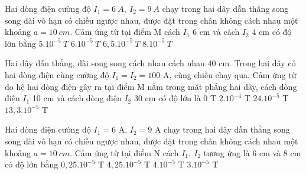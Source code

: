 \begin{vidu} %
Hai dòng điện cường độ $I_1=6\ A,\ I_2=9\ A$ chạy trong hai dây dẫn thẳng song song dài vô hạn có chiều ngược nhau, được đặt trong chân không cách nhau một khoảng $a=10\ cm$. Cảm ứng từ tại điểm M cách $I_1$ 6 cm và cách $I_2$ 4 cm có độ lớn bằng
\choice
{$5.10^{-5}\ T$}
{$6.10^{-5}\ T$}
{\True $6,5.10^{-5}\ T$}
{$8.10^{-5}\ T$}
\end{vidu}
\begin{vidu} %
Hai dây dẫn thẳng, dài song song cách nhau cách nhau 40 cm. Trong hai dây có hai dòng điện cùng cường độ $I_1 = I_2 = 100$ A, cùng chiều chạy qua. Cảm ứng từ do hệ hai dòng điện gây ra tại điểm M nằm trong mặt phẳng hai dây, cách dòng điện ${I_1}$ 10 cm và cách dòng điện ${I_2}$ 30 cm có độ lớn là
\choice
{0 T}
{$2.10^{-4}$ T}
{$24.10^{-5}$ T}
{\True $13,3.10^{-5}$ T}
\end{vidu}
\begin{vidu} %
Hai dòng điện cường độ $I_1 =6$ A, $I_2 = 9$ A chạy trong hai dây dẫn thẳng song song dài vô hạn có chiều ngược nhau, được đặt trong chân không cách nhau một khoảng $a = 10\ cm$. Cảm ứng từ tại điểm N cách ${I_1},\ {I_2}$ tương ứng là 6 cm và 8 cm có độ lớn bằng
\choice
{$0,25.10^{-5}$ T}
{$4,25.10^{-5}$ T}
{$4.10^{-5}$ T}
{\True $3.10^{-5}$ T}
\end{vidu}
